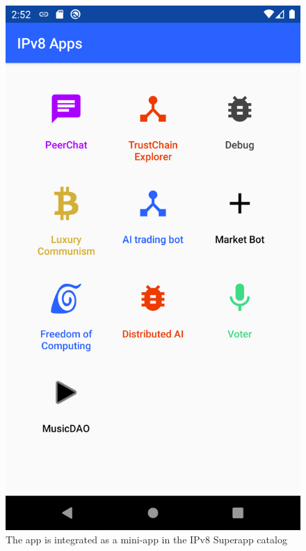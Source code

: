 \begin{figure}
        \includegraphics[width=1\linewidth]{implementation/screenshot-superapp.png}
        \caption{The app is integrated as a mini-app in the IPv8 Superapp catalog}
        \label{fig:screenshot-superapp}
    \endminipage\hfill

\end{figure}
